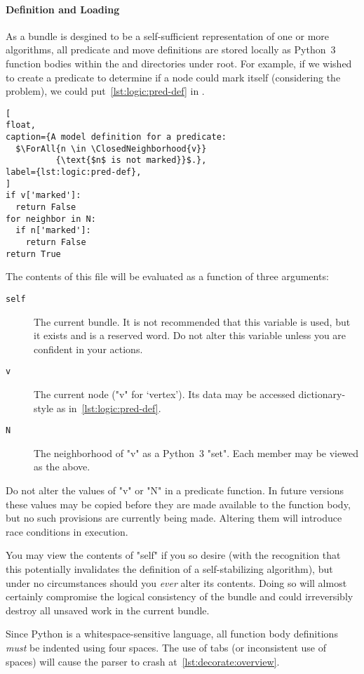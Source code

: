 \paragraph{Definition and Loading}
As a bundle is desgined to be
  a self-sufficient representation
  of one or more algorithms,
  all predicate and move definitions are stored locally
  as Python~3 function bodies within the
   and  directories
  under root.
For example, if we wished to create a predicate
  to determine if a node could mark itself
  (considering the  problem),
  we could put~\autoref{lst:logic:pred-def} in
  .
\begin{lstlisting}[
float,
caption={A model definition for a predicate:
  $\ForAll{n \in \ClosedNeighborhood{v}}
          {\text{$n$ is not marked}}$.},
label={lst:logic:pred-def},
]
if v['marked']:
  return False
for neighbor in N:
  if n['marked']:
    return False
return True
\end{lstlisting} %
The contents of this file will be evaluated as
  a function of three arguments:
\begin{description}
\item[\texttt{self}] The current bundle.
  It is not recommended that this variable is used,
    but it exists and is a reserved word.
  Do not alter this variable unless you are confident in your actions.
\item[\texttt{v}] The current node ("v" for \enquote*{vertex}).
  Its data may be accessed dictionary-style as in~\autoref{lst:logic:pred-def}.
\item[\texttt{N}] The neighborhood of "v" as a Python~3 "set".
  Each member may be viewed as the above.
\end{description} %
\begin{warning}
  Do not alter the values of "v" or "N" in a predicate function.
  In future versions these values may be copied
    before they are made available to the function body,
    but no such provisions are currently being made.
  Altering them will introduce race conditions in execution.
\end{warning} %
\begin{warning}
  You may view the contents of "self" if you so desire
    (with the recognition that this potentially invalidates
    the definition of a self-stabilizing algorithm),
  but under no circumstances should you \emph{ever} alter its contents.
  Doing so will almost certainly compromise the logical consistency
    of the bundle and could irreversibly destroy all unsaved work
    in the current bundle.
\end{warning} %
\begin{warning}
  Since Python is a whitespace-sensitive language,
    all function body definitions \emph{must} be indented
    using four spaces.
  The use of tabs (or inconsistent use of spaces)
    will cause the parser to crash at~\autoref{lst:decorate:overview}.
\end{warning} %

